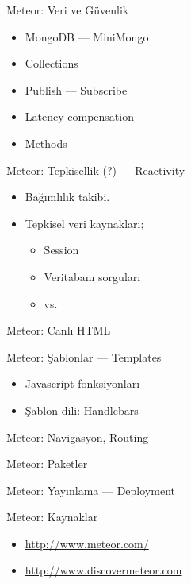 \documentclass{beamer}
\begin{document}
    \begin{frame}{Meteor: Veri ve Güvenlik}
        \begin{itemize}
            \item MongoDB --- MiniMongo
            \item Collections
            \item Publish --- Subscribe
            \item Latency compensation
            \item Methods
        \end{itemize}
    \end{frame}

    \begin{frame}{Meteor: Tepkisellik (?) --- Reactivity}
        \begin{itemize}
            \item Bağımlılık takibi.
            \item Tepkisel veri kaynakları;
                \begin{itemize}
                    \item Session
                    \item Veritabanı sorguları
                    \item vs.
                \end{itemize}
        \end{itemize}
    \end{frame}

    \begin{frame}{Meteor: Canlı HTML}
    \end{frame}

    \begin{frame}{Meteor: Şablonlar --- Templates}
        \begin{itemize}
            \item Javascript fonksiyonları
            \item Şablon dili: Handlebars
        \end{itemize}
    \end{frame}

    \begin{frame}{Meteor: Navigasyon, Routing}
    \end{frame}

    \begin{frame}{Meteor: Paketler}
    \end{frame}

    \begin{frame}{Meteor: Yay{\i}nlama --- Deployment}
    \end{frame}

    \begin{frame}{Meteor: Kaynaklar}
        \begin{itemize}
            \item \url{http://www.meteor.com/}
            \item \url{http://www.discovermeteor.com}
        \end{itemize}
    \end{frame}
\end{document}
